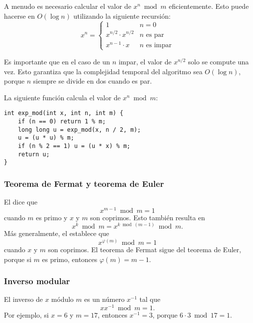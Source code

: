A menudo es necesario calcular el valor de $x^n \bmod m$ eficientemente.
Esto puede hacerse en $O(\log n)$ utilizando la siguiente recursión:
\begin{equation*}
    x^n = \begin{cases}
        1                     & n = 0               \\
        x^{n/2} \cdot x^{n/2} & \text{$n$ es par}   \\
        x^{n-1} \cdot x       & \text{$n$ es impar}
    \end{cases}
\end{equation*}

Es importante que en el caso de un $n$ impar, el valor de $x^{n/2}$ solo
se compute una vez. Esto garantiza que la complejidad temporal del algoritmo
sea $O(\log n)$, porque $n$ siempre se divide en dos cuando es par.

La siguiente función calcula el valor de $x^n \bmod m$:

\begin{lstlisting}
int exp_mod(int x, int n, int m) {
    if (n == 0) return 1 % m;
    long long u = exp_mod(x, n / 2, m);
    u = (u * u) % m;
    if (n % 2 == 1) u = (u * x) % m;
    return u;
}
\end{lstlisting}

\subsubsection{Teorema de Fermat y teorema de Euler}


El  dice que
\[x^{m-1} \bmod m = 1\]
cuando $m$ es primo y $x$ y $m$ son coprimos. Esto también resulta en
\[x^k \bmod m = x^{k \bmod (m-1)} \bmod m.\]
Más generalmente, el  establece que
\[x^{\varphi(m)} \bmod m = 1\]
cuando $x$ y $m$ son coprimos. El teorema de Fermat sigue del teorema
de Euler, porque si $m$ es primo, entonces $\varphi(m)=m-1$.

\subsubsection{Inverso modular}


El inverso de $x$ módulo $m$ es un número $x^{-1}$ tal que
\[ x x^{-1} \bmod m = 1. \]
Por ejemplo, si $x=6$ y $m=17$, entonces $x^{-1}=3$, porque
$6\cdot3 \bmod 17=1$.


